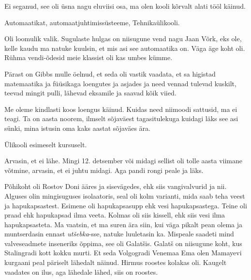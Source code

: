
Ei seganud, see oli üsna nagu eluviisi osa,  ma olen kooli kõrvalt alati tööl 
käinud.
        
         
Automaatikat, automaatjuhtimissüsteeme, Tehnikaülikooli.


Oli loomulik valik. Sugulaste hulgas on niisugune vend nagu Jaan 
Võrk, eks ole, kelle kaudu ma natuke kuulsin, et mis asi 
see automaatika on. Väga äge koht oli. Rühma vendi-õdesid meie klassist 
oli kas umbes kümme. 
                 
Pärast on Gibbs mulle öelnud, et seda oli  
vastik vaadata, et sa higistad matemaatika ja füüsikaga loengutes ja asjades ja 
need vennad tulevad kuskilt, teevad  mingit pulli, lähevad eksamile ja saavad 
kõik viied. 


Me oleme kindlasti koos loengus käinud. Kuidas need niimoodi sattusid, ma ei 
teagi. Ta on aasta noorem, ilmselt  sõjaväest tagasitulekuga kuidagi läks see 
asi sünki, mina istusin oma kaks aastat sõjaväes ära.
                 

Ülikooli esimeselt kursuselt.

Arvasin, et ei lähe. Mingi 12. detsember või midagi sellist oli tolle aasta 
viimane võtmine, arvasin, et ei juhtu midagi. Aga pandi rongi peale ja läks.


Põhikoht oli Rostov Doni ääres ja sisevägedes, ehk siis vangivalvurid ja nii. 
Alguses olin  mingisuguses isolaatoris, seal oli kolm varianti, mida saab teha 
veest ja hapukapsastest. Esimene oli hapukapsasupp ehk vesi hapukapsastega. 
Teine oli praad ehk hapukapsad ilma veeta. Kolmas oli siis kissell, ehk siis 
vesi ilma hapukapsasteta. Ma vaatsin, et ma suren ära siin, kui väga pikalt 
pean olema  ja muntserdasin ennast \emph{utšebka}-sse, 
natuke luuletasin 
ka. Mispeale saadeti mind valveseadmete  inseneriks õppima, see oli 
Galatšis. Galatš  on niisugune koht, kus Stalingradi kott kokku murti. Et seda 
Volgogradi Venemaa Ema olen  Mamayevi kurgaani peal päriselt lähedalt näinud. 
Hirmus roostes kolakas oli. Kaugelt vaadates on ilus, aga lähedale lähed, siis 
on roostes.

